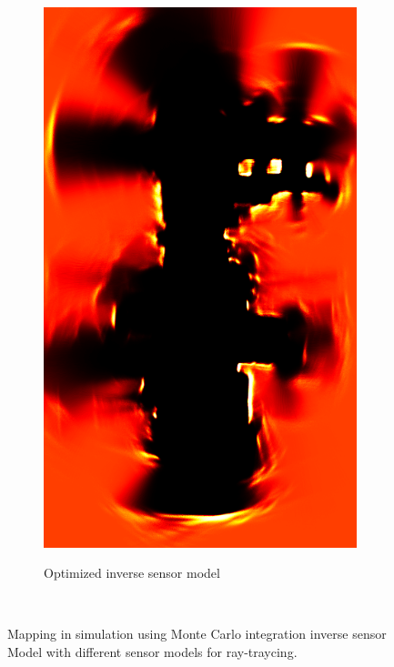 \begin{figure}[htbp]
\begin{subfigure}[t]{0.45\textwidth}
		\includegraphics[width=\textwidth]{figures/static_mapping/monte_carlo_map_optimized}		
		\label{fig:particle_shot-croped}
		\caption{Optimized inverse sensor model}
	\end{subfigure}
	~ %
	\caption{Mapping in simulation using Monte Carlo integration inverse sensor Model with different sensor models for ray-traycing.}
\end{figure}

